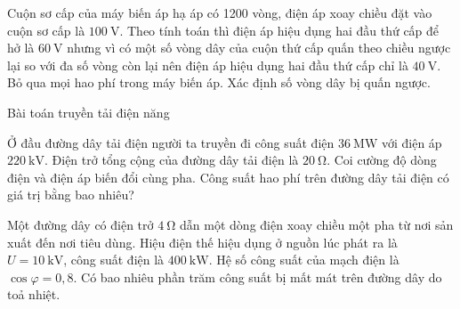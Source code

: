 \begin{vd}
Cuộn sơ cấp của máy biến áp hạ áp có 1200 vòng, điện áp xoay chiều đặt vào cuộn sơ cấp là $\SI{100}{\volt}$. Theo tính toán thì điện áp hiệu dụng hai đầu thứ cấp để hở là $\SI{60}{\volt}$ nhưng vì có một số vòng dây của cuộn thứ cấp quấn theo chiều ngược lại so với đa số vòng còn lại nên điện áp hiệu dụng hai đầu thứ cấp chỉ là $\SI{40}{\volt}$. Bỏ qua mọi hao phí trong máy biến áp. Xác định số vòng dây bị quấn ngược.
\end{vd}
\begin{dang}{Bài toán truyền tải điện năng}
\end{dang}
\begin{vd}
Ở đầu đường dây tải điện người ta truyền đi công suất điện $\SI{36}{\mega\watt}$ với điện áp $\SI{220}{\kilo\volt}$. Điện trở tổng cộng của đường dây tải điện là $\SI{20}{\ohm}$. Coi cường độ dòng điện và điện áp biến đổi cùng pha. Công suất hao phí trên đường dây tải điện có giá trị bằng bao nhiêu?
\end{vd}
\begin{vd}
Một đường dây có điện trở $\SI{4}{\ohm}$ dẫn một dòng điện xoay chiều một pha từ nơi sản xuất đến nơi tiêu dùng. Hiệu điện thế hiệu dụng ở nguồn lúc phát ra là $U=\SI{10}{\kilo\volt}$, công suất điện là $\SI{400}{\kilo\watt}$. Hệ số công suất của mạch điện là $\cos\varphi=0,8$. Có bao nhiêu phần trăm công suất bị mất mát trên đường dây do toả nhiệt.
\end{vd}
